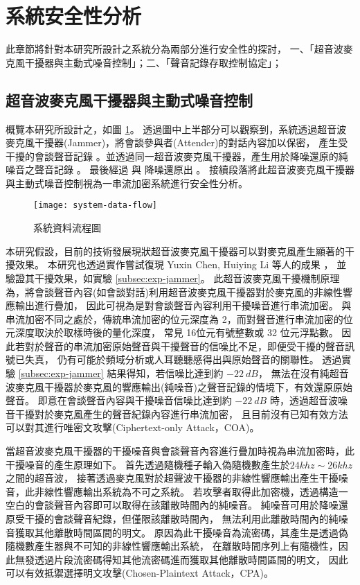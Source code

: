 \section{系統安全性分析}\label{sec:analysis}

    此章節將針對本研究所設計之系統分為兩部分進行安全性的探討，
一、「超音波麥克風干擾器與主動式噪音控制」；二、「聲音記錄存取控制協定」；


\subsection{超音波麥克風干擾器與主動式噪音控制}

    概覽本研究所設計之，如圖 \ref{fig:system-data-flow}。
透過圖中上半部分可以觀察到，系統透過超音波麥克風干擾器(Jammer)，將會談參與者(Attender)的對話內容加以保密，
產生受干擾的會談聲音記錄 \DEFrecJ。並透過同一超音波麥克風干擾器，產生用於降噪還原的純噪音之聲音記錄 \DEFrecN。
最後經過 \DEFfuncEstm{} 與 \DEFfuncAnc{} 降噪還原出 \DEFrecREV。
接續段落將此超音波麥克風干擾器與主動式噪音控制視為一串流加密系統進行安全性分析。

\begin{figure}[H]
    \centering
    \texttt{[image: system-data-flow]}
    \caption{系統資料流程圖}\label{fig:system-data-flow}
\end{figure}

    本研究假設，目前的技術發展現狀超音波麥克風干擾器可以對麥克風產生顯著的干擾效果\cite{chen2020demonstrating}。
本研究也透過實作嘗試復現 Yuxin Chen, Huiying Li 等人的成果 \cite{chen2020wearable}，
並驗證其干擾效果，如實驗 \ref{subsec:exp-jammer}。
此超音波麥克風干擾機制原理為，將會談聲音內容(如會談對話)利用超音波麥克風干擾器對於麥克風的非線性響應輸出進行疊加，
因此可視為是對會談聲音內容利用干擾噪音進行串流加密。
與串流加密不同之處於，傳統串流加密的位元深度為 2，而對聲音進行串流加密的位元深度取決於取樣時後的量化深度，
常見 16位元有號整數或 32 位元浮點數。
因此若對於聲音的串流加密原始聲音與干擾聲音的信噪比不足，即便受干擾的聲音訊號已失真，
仍有可能於頻域分析或人耳聽聽感得出與原始聲音的關聯性。
透過實驗 \ref{subsec:exp-jammer} 結果得知，若信噪比達到約 $-22~dB$，
無法在沒有純超音波麥克風干擾器於麥克風的響應輸出(純噪音)之聲音記錄的情境下，有效還原原始聲音。
即意在會談聲音內容與干擾噪音信噪比達到約 $-22~dB$ 時，透過超音波噪音干擾對於麥克風產生的聲音紀錄內容進行串流加密，
且目前沒有已知有效方法可以對其進行唯密文攻擊(Ciphertext-only Attack，COA)。

    當超音波麥克風干擾器的干擾噪音與會談聲音內容進行疊加時視為串流加密時，此干擾噪音的產生原理如下。
首先透過隨機種子輸入偽隨機數產生於$24khz\sim26khz$之間的超音波，
接著透過麥克風對於超聲波干擾器的非線性響應輸出產生干擾噪音，此非線性響應輸出系統為不可之系統。
若攻擊者取得此加密機，透過構造一空白的會談聲音內容即可以取得在該離散時間內的純噪音。
純噪音可用於降噪還原受干擾的會談聲音紀錄，但僅限該離散時間內，
無法利用此離散時間內的純噪音獲取其他離散時間區間的明文。
原因為此干擾噪音為流密碼，其產生是透過偽隨機數產生器與不可知的非線性響應輸出系統，
在離散時間序列上有隨機性，因此無發透過片段流密碼得知其他流密碼進而獲取其他離散時間區間的明文，
因此可以有效抵禦選擇明文攻擊(Chosen-Plaintext Attack，CPA)。

